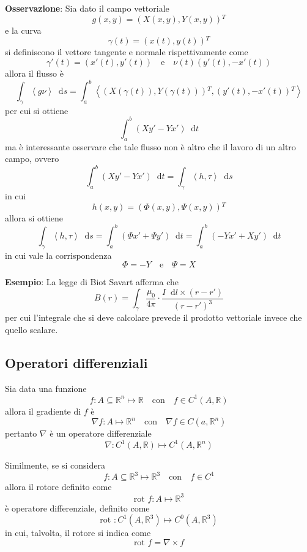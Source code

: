 \documentclass[a4paper]{extarticle}
\newcommand*\dif{\mathop{}\!\mathrm{d}}
\begin{document}
\vspace{2em}
\noindent
\textbf{Osservazione}: Sia dato il campo vettoriale
\[g(x,y) = \left(X(x,y),Y(x,y)\right){^T}\]
e la curva
\[\gamma(t) = \left(x(t),y(t)\right){^T}\]
si definiscono il vettore tangente e normale rispettivamente come
\[\gamma'(t)=\left(x'(t),y'(t)\right) \hspace{1em} \text{e} \hspace{1em} \nu(t)\left(y'(t),-x'(t)\right)\]
allora il flusso è
\[\int_\gamma \left<g\nu\right> \dif s = \int_a^b \left<\left(X(\gamma(t)), Y(\gamma(t))\right){^T}, \left(y'(t),-x'(t)\right){^T}\right>\]
per cui si ottiene
\[\int_a^b \left(X y' - Y x'\right) \dif t\]
ma è interessante osservare che tale flusso non è altro che il lavoro di un altro campo, ovvero
\[\int_a^b \left(X y' - Y x'\right) \dif t = \int_\gamma \left<h,\tau\right> \dif s\]
in cui
\[h(x,y) = \left(\Phi(x,y),\Psi(x,y)\right){^T}\]
allora si ottiene
\[\int_\gamma \left<h,\tau\right> \dif s = \int_a^b \left(\Phi x' + \Psi y'\right) \dif t = \int_a^b \left(-Y x' + X y'\right) \dif t\]
in cui vale la corrispondenza
\[\Phi=-Y \hspace{1em} \text{e} \hspace{1em} \Psi=X\]

\vspace{2em}
\noindent
\textbf{Esempio}: La legge di Biot Savart afferma che
\[B(r) = \int_\gamma \dfrac{\mu_0}{4 \pi} \cdot \dfrac{I \dif l \times (r-r')}{(r-r')^3}\]
per cui l'integrale che si deve calcolare prevede il prodotto vettoriale invece che quello scalare.

\vspace{1em}
\subsection{Operatori differenziali}
Sia data una funzione
\[f : A \subseteq \mathbb{R}^n \longmapsto \mathbb{R} \hspace{1em} \text{con} \hspace{1em} f \in C^1(A,\mathbb{R})\]
allora il gradiente di $f$ è
\[\nabla f : A \longmapsto \mathbb{R}^n \hspace{1em} \text{con} \hspace{1em} \nabla f \in C(a,\mathbb{R}^n)\]
pertanto $\nabla$ è un operatore differenziale
\[\nabla : C^1(A,\mathbb{R}) \longmapsto C^1(A,\mathbb{R}^n)\]

\vspace{1em}
\noindent
Similmente, se si considera
\[f : A \subseteq \mathbb{R}^3 \longmapsto \mathbb{R}^3 \hspace{1em} \text{con} \hspace{1em} f \in C^1\]
allora il rotore definito come
\[\text{rot } f : A \longmapsto \mathbb{R}^3\]
è operatore differenziale, definito come
\[\text{rot } : C^1(A,\mathbb{R}^3) \longmapsto C^0(A,\mathbb{R}^3)\]
in cui, talvolta, il rotore si indica come
\[\text{rot } f = \nabla \times f\]
\end{document}

